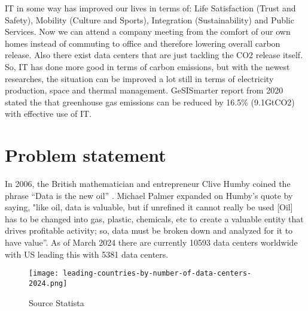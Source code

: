 \documentclass[
  a4paper,  %
  twoside,  %
  bibliography=totoc,
  headsepline,
  cleardoublepage=empty,
  parskip=half,
  draft=false
]{scrbook}
\begin{document}
IT in some way has improved our lives in terms of: Life Satisfaction (Trust and Safety), Mobility (Culture and Sports), Integration (Sustainability) and Public Services\cite{nevado2019improving}. Now we can attend a company meeting from the comfort of our own homes instead of commuting to office and therefore lowering overall carbon release. Also there exist data centers that are just tackling the CO2 release itself. So, IT has done more good in terms of carbon emissions, but with the newest researches, the situation can be improved a lot still in terms of electricity production, space and thermal management. GeSISmarter report from 2020 stated the that greenhouse gas emissions can be reduced by 16.5\% (9.1GtCO2) with effective use of IT\cite{cosar2019carbon}. 


\section{Problem statement}

In 2006, the British mathematician and entrepreneur Clive Humby coined the phrase “Data is the new oil” \cite{humby2006data}. Michael Palmer expanded on Humby's quote by saying, "like oil, data is valuable, but if unrefined it cannot really be used [Oil] has to be changed into gas, plastic, chemicals, etc to create a valuable entity that drives profitable activity; so, data must be broken down and analyzed for it to have value”\cite{palmer2006}. As of March 2024 there are currently 10593 data centers worldwide with US leading this with 5381 data centers\cite{statista_2024}. 

\begin{figure}
	\centering
	\texttt{[image: leading-countries-by-number-of-data-centers-2024.png]}
	\caption{Source Statista\cite{statista_2024}}
	\label{fig:chor1}
\end{figure}
\end{document}
